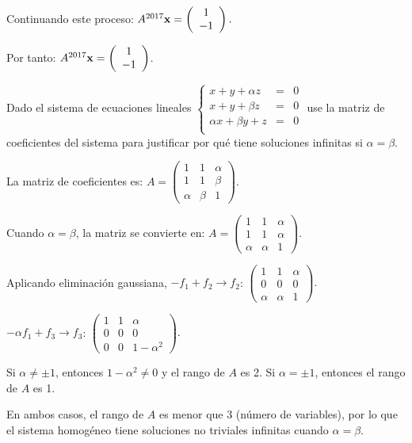 \begin{myproof}
Continuando este proceso: $A^{2017}{\bf x} = \left( \begin{array}{c} 1 \\ -1 \end{array} \right).$

Por tanto: $A^{2017}{\bf x} = \left( \begin{array}{c} 1 \\ -1 \end{array} \right)$.
\end{myproof}

\begin{prob}
Dado el sistema de ecuaciones lineales $\left\lbrace \begin{array}{ccc }
x + y + \alpha z&=&0\\
x + y + \beta z&=&0\\
\alpha x + \beta y + z&=&0\\
\end{array} \right.$ use la matriz de coeficientes del sistema para justificar por qué tiene soluciones infinitas si $\alpha=\beta.$


\end{prob}

\begin{myproof}
La matriz de coeficientes es: $A = \left( \begin{array}{ccc}
1 & 1 & \alpha \\
1 & 1 & \beta \\
\alpha & \beta & 1
\end{array} \right).$

Cuando $\alpha = \beta$, la matriz se convierte en: $A = \left( \begin{array}{ccc}
1 & 1 & \alpha \\
1 & 1 & \alpha \\
\alpha & \alpha & 1
\end{array} \right).$

Aplicando eliminación gaussiana, $-f_1 + f_2 \to f_2$: $\left( \begin{array}{ccc}
1 & 1 & \alpha \\
0 & 0 & 0 \\
\alpha & \alpha & 1
\end{array} \right).$

$-\alpha f_1 + f_3 \to f_3$: $\left( \begin{array}{ccc}
1 & 1 & \alpha \\
0 & 0 & 0 \\
0 & 0 & 1-\alpha^2
\end{array} \right).$

Si $\alpha \neq \pm 1$, entonces $1-\alpha^2 \neq 0$ y el rango de $A$ es 2.
Si $\alpha = \pm 1$, entonces el rango de $A$ es 1.

En ambos casos, el rango de $A$ es menor que 3 (número de variables), por lo que el sistema homogéneo tiene soluciones no triviales infinitas cuando $\alpha = \beta$.
\end{myproof}

